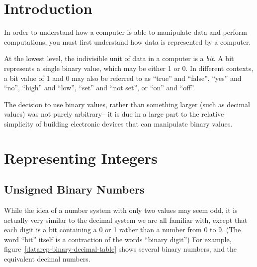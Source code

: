 
\section{Introduction}

In order to understand how a computer is able
to manipulate data and perform computations,
you must first understand how data is represented by a computer.

At the lowest level, the indivisible unit of data in a computer is a
{\em bit}.
A bit represents a single binary value, which may be either 1 or 0.
In different contexts, a bit value of 1 and 0 may also be referred to as
``true'' and ``false'',
``yes'' and ``no'',
``high'' and ``low'',
``set'' and ``not set'', or
``on'' and ``off''.

The decision to use binary values, rather than something larger (such
as decimal values) was not purely arbitrary-- it is due
in a large part to the relative simplicity of building electronic
devices that can manipulate binary values.


\section{Representing Integers}

\subsection{Unsigned Binary Numbers}


While the idea of a number system with only two values may
seem odd, it is actually very similar to the decimal system
we are all familiar
with, except that each digit is a bit containing a 0 or 1
rather than a number from 0 to 9.
(The word ``bit'' itself is a contraction of the words ``binary digit'')
For example, figure~\ref{datarep-binary-decimal-table} shows several
binary numbers, and the equivalent decimal numbers.

